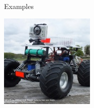 \begin {frame} {Examples}
	\begin {center}
		\includegraphics [width=.5\textwidth,keepaspectratio] {img/rover}
	\end {center}
\end {frame}
